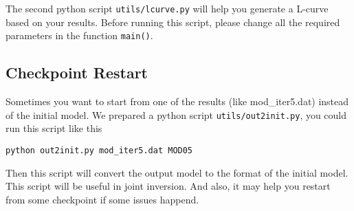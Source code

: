 \documentclass[UTF8]{article}
\begin{document}
The second python script \texttt{utils/lcurve.py} will help you 
generate a L-curve based on your results. Before running 
this script, please change all the 
required parameters in the function \texttt{main()}.  

\subsection{Checkpoint Restart}
Sometimes you want to start from one of the results (like mod\_iter5.dat)
instead of the initial model. We prepared a python script
\texttt{utils/out2init.py}, you could run this script like this 
\begin{lstlisting}
python out2init.py mod_iter5.dat MOD05 
\end{lstlisting}
Then this script will convert the output model to the format 
of the initial model. This script will be useful in joint inversion.
And also, it may help you restart from some checkpoint if some issues 
happend.




\end{document}
